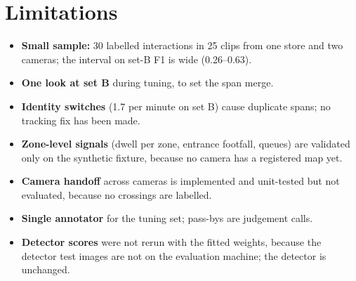 \section{Limitations}
\label{sec:cv-limits}
\begin{itemize}
\item \textbf{Small sample:} 30 labelled interactions in 25 clips from one store and two cameras; the interval on set-B F1 is wide (0.26--0.63).
\item \textbf{One look at set B} during tuning, to set the span merge.
\item \textbf{Identity switches} (1.7 per minute on set B) cause duplicate spans; no tracking fix has been made.
\item \textbf{Zone-level signals} (dwell per zone, entrance footfall, queues) are validated only on the synthetic fixture, because no camera has a registered map yet.
\item \textbf{Camera handoff} across cameras is implemented and unit-tested but not evaluated, because no crossings are labelled.
\item \textbf{Single annotator} for the tuning set; pass-bys are judgement calls.
\item \textbf{Detector scores} were not rerun with the fitted weights, because the detector test images are not on the evaluation machine; the detector is unchanged.
\end{itemize}
